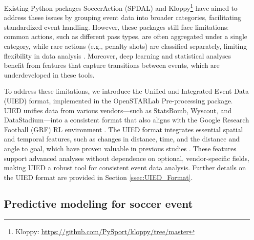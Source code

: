 Existing Python packages SoccerAction (SPDAL) \citep{decroos2020vaep} and Kloppy\footnote{Kloppy: \url{https://github.com/PySport/kloppy/tree/master}} have aimed to address these issues by grouping event data into broader categories, facilitating standardized event handling. However, these packages still face limitations: common actions, such as different pass types, are often aggregated under a single category, while rare actions (e.g., penalty shots) are classified separately, limiting flexibility in data analysis \citep{yeung2024unveiling}. Moreover, deep learning and statistical analyses benefit from features that capture transitions between events, which are underdeveloped in these tools.

To address these limitations, we introduce the Unified and Integrated Event Data (UIED) format, implemented in the OpenSTARLab Pre-processing package. UIED unifies data from various vendors—such as StatsBomb, Wyscout, and DataStadium—into a consistent format that also aligns with the Google Research Football (GRF) RL environment \citep{kurach2020google}. The UIED format integrates essential spatial and temporal features, such as changes in distance, time, and the distance and angle to goal, which have proven valuable in previous studies \citep{yeung2024unveiling,yeung2023events,yeung2023transformer,simpson2022seq2event}. These features support advanced analyses without dependence on optional, vendor-specific fields, making UIED a robust tool for consistent event data analysis. Further details on the UIED format are provided in Section \ref{ssec:UIED_Format}.



\subsection{Predictive modeling for soccer event}
\label{ssec:predictive_modeling_for_soccer_event}

